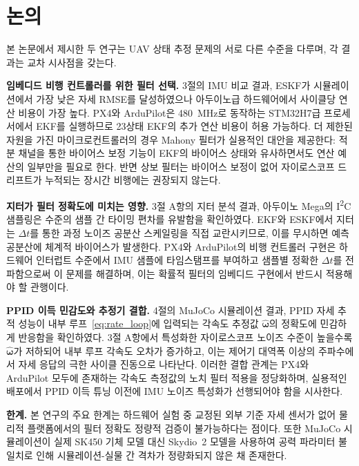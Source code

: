\section{논의}
\label{sec:discussion}

본 논문에서 제시한 두 연구는 UAV 상태 추정 문제의 서로 다른 수준을 다루며,
각 결과는 교차 시사점을 갖는다.

\textbf{임베디드 비행 컨트롤러를 위한 필터 선택.}
3절의 IMU 비교 결과, ESKF가 시뮬레이션에서 가장 낮은 자세 RMSE를 달성하였으나
아두이노급 하드웨어에서 사이클당 연산 비용이 가장 높다.
PX4와 ArduPilot은 \SI{480}{\mega\hertz}로 동작하는 STM32H7급 프로세서에서 EKF를 실행하므로
23상태 EKF의 추가 연산 비용이 허용 가능하다.
더 제한된 자원을 가진 마이크로컨트롤러의 경우 Mahony 필터가 실용적인 대안을 제공한다:
적분 채널을 통한 바이어스 보정 기능이 EKF의 바이어스 상태와 유사하면서도
연산 예산의 일부만을 필요로 한다.
반면 상보 필터는 바이어스 보정이 없어 자이로스코프 드리프트가 누적되는
장시간 비행에는 권장되지 않는다.

\textbf{지터가 필터 정확도에 미치는 영향.}
3절 A항의 지터 분석 결과, 아두이노 Mega의 I\textsuperscript{2}C 샘플링은
수준의 샘플 간 타이밍 편차를 유발함을 확인하였다.
EKF와 ESKF에서 지터는 $\Delta t$를 통한 과정 노이즈 공분산 스케일링을 직접 교란시키므로,
이를 무시하면 예측 공분산에 체계적 바이어스가 발생한다.
PX4와 ArduPilot의 비행 컨트롤러 구현은 하드웨어 인터럽트 수준에서 IMU 샘플에 타임스탬프를 부여하고
샘플별 정확한 $\Delta t$를 전파함으로써 이 문제를 해결하며,
이는 확률적 필터의 임베디드 구현에서 반드시 적용해야 할 관행이다.

\textbf{PPID 이득 민감도와 추정기 결합.}
4절의 MuJoCo 시뮬레이션 결과, PPID 자세 추적 성능이
내부 루프~\eqref{eq:rate_loop}에 입력되는 각속도 추정값 $\hat{\boldsymbol{\omega}}$의 정확도에
민감하게 반응함을 확인하였다.
3절 A항에서 특성화한 자이로스코프 노이즈 수준이 높을수록 $\hat{\boldsymbol{\omega}}$가 저하되어
내부 루프 각속도 오차가 증가하고, 이는 제어기 대역폭 이상의 주파수에서
자세 응답의 극한 사이클 진동으로 나타난다.
이러한 결합 관계는 PX4와 ArduPilot 모두에 존재하는 각속도 측정값의 노치 필터 적용을 정당화하며,
실용적인 배포에서 PPID 이득 튜닝 이전에 IMU 노이즈 특성화가 선행되어야 함을 시사한다.

\textbf{한계.}
본 연구의 주요 한계는 하드웨어 실험 중 교정된 외부 기준 자세 센서가 없어
물리적 플랫폼에서의 필터 정확도 정량적 검증이 불가능하다는 점이다.
또한 MuJoCo 시뮬레이션이 실제 SK450 기체 모델 대신 Skydio~2 모델을 사용하여
공력 파라미터 불일치로 인해 시뮬레이션-실물 간 격차가 정량화되지 않은 채 존재한다.

